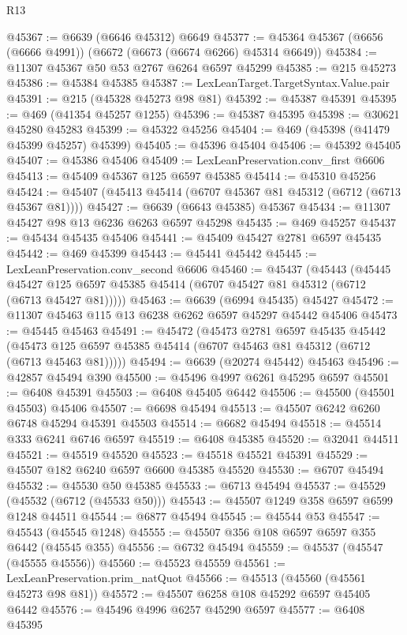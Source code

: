 \begin{lexlean}{R13}
\begin{coremodule}
@45367 := @6639 (@6646 @45312) @6649
@45377 := @45364 @45367 (@6656 (@6666 @4991)) (@6672 (@6673 (@6674 @6266) @45314 @6649))
@45384 := @11307 @45367 @50 @53 @2767 @6264 @6597 @45299
@45385 := @215 @45273
@45386 := @45384 @45385
@45387 := LexLeanTarget.TargetSyntax.Value.pair
@45391 := @215 (@45328 @45273 @98 @81)
@45392 := @45387 @45391
@45395 := @469 (@41354 @45257 @1255)
@45396 := @45387 @45395
@45398 := @30621 @45280 @45283
@45399 := @45322 @45256
@45404 := @469 (@45398 (@41479 @45399 @45257) @45399)
@45405 := @45396 @45404
@45406 := @45392 @45405
@45407 := @45386 @45406
@45409 := LexLeanPreservation.conv_first @6606
@45413 := @45409 @45367 @125 @6597 @45385
@45414 := @45310 @45256
@45424 := @45407 (@45413 @45414 (@6707 @45367 @81 @45312 (@6712 (@6713 @45367 @81))))
@45427 := @6639 (@6643 @45385) @45367
@45434 := @11307 @45427 @98 @13 @6236 @6263 @6597 @45298
@45435 := @469 @45257
@45437 := @45434 @45435 @45406
@45441 := @45409 @45427 @2781 @6597 @45435
@45442 := @469 @45399
@45443 := @45441 @45442
@45445 := LexLeanPreservation.conv_second @6606
@45460 := @45437
    (@45443
      (@45445 @45427 @125 @6597 @45385 @45414 (@6707 @45427 @81 @45312 (@6712 (@6713 @45427 @81)))))
@45463 := @6639 (@6994 @45435) @45427
@45472 := @11307 @45463 @115 @13 @6238 @6262 @6597 @45297 @45442 @45406
@45473 := @45445 @45463
@45491 := @45472
    (@45473
      @2781
      @6597
      @45435
      @45442
      (@45473 @125 @6597 @45385 @45414 (@6707 @45463 @81 @45312 (@6712 (@6713 @45463 @81)))))
@45494 := @6639 (@20274 @45442) @45463
@45496 := @42857 @45494 @390
@45500 := @45496 @4997 @6261 @45295 @6597
@45501 := @6408 @45391
@45503 := @6408 @45405 @6442
@45506 := @45500 (@45501 @45503) @45406
@45507 := @6698 @45494
@45513 := @45507 @6242 @6260 @6748 @45294 @45391 @45503
@45514 := @6682 @45494
@45518 := @45514 @333 @6241 @6746 @6597
@45519 := @6408 @45385
@45520 := @32041 @44511
@45521 := @45519 @45520
@45523 := @45518 @45521 @45391
@45529 := @45507 @182 @6240 @6597 @6600 @45385 @45520
@45530 := @6707 @45494
@45532 := @45530 @50 @45385
@45533 := @6713 @45494
@45537 := @45529 (@45532 (@6712 (@45533 @50)))
@45543 := @45507 @1249 @358 @6597 @6599 @1248 @44511
@45544 := @6877 @45494
@45545 := @45544 @53
@45547 := @45543 (@45545 @1248)
@45555 := @45507 @356 @108 @6597 @6597 @355 @6442 (@45545 @355)
@45556 := @6732 @45494
@45559 := @45537 (@45547 (@45555 @45556))
@45560 := @45523 @45559
@45561 := LexLeanPreservation.prim_natQuot
@45566 := @45513 (@45560 (@45561 @45273 @98 @81))
@45572 := @45507 @6258 @108 @45292 @6597 @45405 @6442
@45576 := @45496 @4996 @6257 @45290 @6597
@45577 := @6408 @45395

\end{coremodule}
\end{lexlean}
